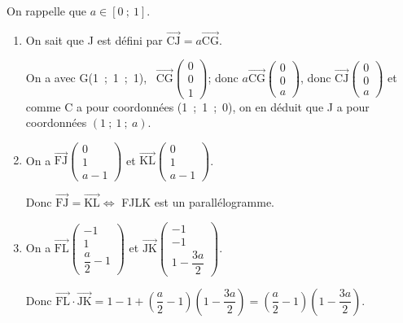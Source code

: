\documentclass[10pt]{article}
\providecommand{\vect}[1]{\overrightarrow{#1}}
\begin{document}
On rappelle que $a \in [0~;~1]$.

\medskip

\begin{enumerate}
\item 
On sait que J est défini par $\vect{\text{CJ}} = a \vect{\text{CG}}$.

On a avec G(1~;~1~;~1), \, $\vect{\text{CG}}\begin{pmatrix}0\\0\\ 1\end{pmatrix}$; donc $a \vect{\text{CG}}\begin{pmatrix}0\\0\\a\end{pmatrix}$, donc $\vect{\text{CJ}}\begin{pmatrix}0\\0\\a\end{pmatrix}$ et comme C a pour coordonnées (1~;~1~;~0), on en déduit que J a pour coordonnées $(1~;~1~;~a)$.
\item 
On a $\vect{\text{FJ}}\begin{pmatrix}0\\1\\a - 1\end{pmatrix}$ et $\vect{\text{KL}}\begin{pmatrix}0\\1\\a - 1\end{pmatrix}$.

Donc $\vect{\text{FJ}} = \vect{\text{KL}} \iff $ FJLK est un parallélogramme.
\item 
On a $\vect{\text{FL}}\begin{pmatrix}-1\\1\\\dfrac{a}{2} - 1\end{pmatrix}$ et $\vect{\text{JK}}\begin{pmatrix}- 1\\-1\\1 - \dfrac{3a}{2} \end{pmatrix}$.

Donc $\vect{\text{FL}} \cdot \vect{\text{JK}} = 1 - 1 + 
\left(\dfrac{a}{2} - 1 \right)\left(1 - \dfrac{3a}{2} \right) = \left(\dfrac{a}{2} - 1 \right)\left(1 - \dfrac{3a}{2} \right)$.


\end{enumerate}
\end{document}
